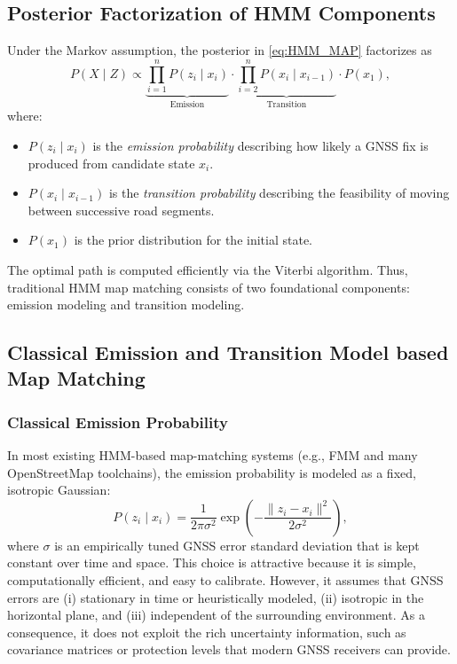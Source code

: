 \documentclass[letterpaper,journal]{IEEEtran}
\begin{document}
\subsection{Posterior Factorization of HMM Components}
Under the Markov assumption, the posterior in \eqref{eq:HMM_MAP} factorizes as
\begin{equation}
    P(X \mid Z) \propto
    \underbrace{\prod_{i=1}^n P(z_i \mid x_i)}_{\text{Emission}}
    \cdot
    \underbrace{\prod_{i=2}^n P(x_i \mid x_{i-1})}_{\text{Transition}}
    \cdot
    P(x_1),
    \label{eq:posterior_factorized}
\end{equation}
where:
\begin{itemize}
    \item $P(z_i \mid x_i)$ is the \emph{emission probability} describing how
          likely a GNSS fix is produced from candidate state $x_i$.
    \item $P(x_i \mid x_{i-1})$ is the \emph{transition probability} describing
          the feasibility of moving between successive road segments.
    \item $P(x_1)$ is the prior distribution for the initial state.
\end{itemize}

The optimal path is computed efficiently via the Viterbi algorithm. Thus,
traditional HMM map matching consists of two foundational components:
emission modeling and transition modeling.

\subsection{Classical Emission and Transition Model based Map Matching}
\subsubsection{Classical Emission Probability}
In most existing HMM-based map-matching systems (e.g., FMM and many
OpenStreetMap toolchains), the emission probability is modeled as a
fixed, isotropic Gaussian:
\begin{equation}
    P(z_i \mid x_i)
    =
    \frac{1}{2\pi \sigma^2}
    \exp\!\left(
        -\frac{\|z_i - x_i\|^2}{2\sigma^2}
    \right),
    \label{eq:classic_emission}
\end{equation}
where $\sigma$ is an empirically tuned GNSS error standard deviation that
is kept constant over time and space. This choice is attractive because
it is simple, computationally efficient, and easy to calibrate.
However, it assumes that GNSS errors are
(i) stationary in time or heuristically modeled,
(ii) isotropic in the horizontal plane, and
(iii) independent of the surrounding environment.
As a consequence, it does not exploit the rich uncertainty information,
such as covariance matrices or protection levels that modern GNSS
receivers can provide.
\end{document}
